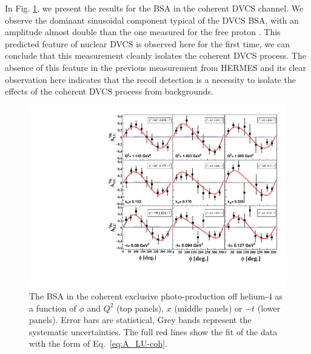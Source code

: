 \documentclass{article}
\begin{document}
In Fig. \ref{fig:CohALUphi}, we present the results for the BSA in the coherent DVCS channel. We 
observe the dominant sinusoidal component typical of the DVCS BSA, with an amplitude almost 
double than the one measured for the free proton \cite{Jo:2015ema}. This 
predicted feature of nuclear DVCS \cite{Guzey:2003jh} is observed here for the first time, we
can conclude that this measurement cleanly isolates the coherent DVCS process. The absence of 
this feature in the previous measurement from HERMES \cite{Airapetian:2009cga} and its clear observation here indicates that the recoil 
detection is a necessity to isolate the effects of the coherent DVCS process from backgrounds. 

\begin{figure}[bp!]
\center
\includegraphics[width=12cm]{fig3/Coherent_ALU_phi.pdf}
	\caption{The BSA in the coherent exclusive photo-production off helium-4 as a 
	function of $\phi$ and $Q^2$ 
	(top panels), $x$ (middle panels) or $-t$ (lower panels). Error bars are  
	statistical, Grey bands represent the systematic uncertainties. The full red lines show
	the fit of the data with the form of Eq.~\ref{eq:A_LU-coh}.}
\label{fig:CohALUphi}
\end{figure}
\end{document}
